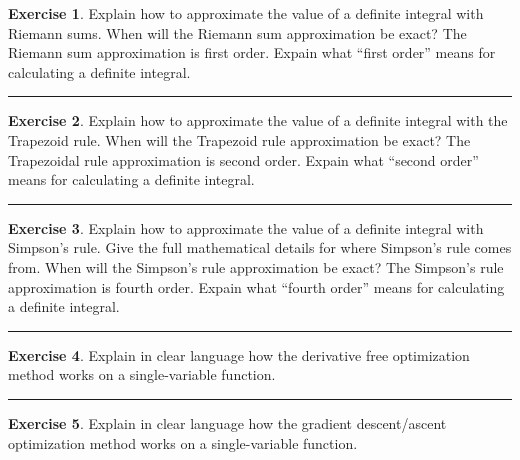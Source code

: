 \documentclass[
]{book}
\theoremstyle{definition}
\theoremstyle{definition}
\theoremstyle{definition}
\newtheorem{exercise}{Exercise}[chapter]
\theoremstyle{remark}
\begin{document}
\begin{exercise}
\protect\hypertarget{exr:unnamed-chunk-252}{}{\label{exr:unnamed-chunk-252} }Explain how to approximate the value of a definite integral with Riemann
sums. When will the Riemann sum approximation be exact? The Riemann sum
approximation is first order. Expain what ``first order'' means for
calculating a definite integral.
\end{exercise}

\begin{center}\rule{0.5\linewidth}{0.5pt}\end{center}

\begin{exercise}
\protect\hypertarget{exr:unnamed-chunk-253}{}{\label{exr:unnamed-chunk-253} }Explain how to approximate the value of a definite integral with the
Trapezoid rule. When will the Trapezoid rule approximation be exact? The
Trapezoidal rule approximation is second order. Expain what ``second
order'' means for calculating a definite integral.
\end{exercise}

\begin{center}\rule{0.5\linewidth}{0.5pt}\end{center}

\begin{exercise}
\protect\hypertarget{exr:unnamed-chunk-254}{}{\label{exr:unnamed-chunk-254} }Explain how to approximate the value of a definite integral with
Simpson's rule. Give the full mathematical details for where Simpson's
rule comes from. When will the Simpson's rule approximation be exact?
The Simpson's rule approximation is fourth order. Expain what ``fourth
order'' means for calculating a definite integral.
\end{exercise}

\begin{center}\rule{0.5\linewidth}{0.5pt}\end{center}

\begin{exercise}
\protect\hypertarget{exr:unnamed-chunk-255}{}{\label{exr:unnamed-chunk-255} }Explain in clear language how the derivative free optimization method
works on a single-variable function.
\end{exercise}

\begin{center}\rule{0.5\linewidth}{0.5pt}\end{center}

\begin{exercise}
\protect\hypertarget{exr:unnamed-chunk-256}{}{\label{exr:unnamed-chunk-256} }Explain in clear language how the gradient descent/ascent optimization
method works on a single-variable function.
\end{exercise}
\end{document}
